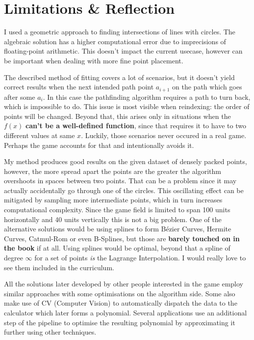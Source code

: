 \documentclass[12pt, titlepage]{article}
\begin{document}
\section{Limitations \& Reflection}
I used a geometric approach to finding intersections of lines with circles.
The algebraic solution has a higher computational error due to imprecisions 
of floating-point arithmetic. This doesn't impact the current usecase,
however can be important when dealing with more fine point placement.

The described method of fitting covers a lot of scenarios, but it doesn't yield 
correct results
when the next intended path point $a_{i + 1}$ on the path which goes after 
some $a_i$. In this case the pathfinding algorithm requires a path to turn back,
which is impossible to do. This issue is most visible when reindexing: the order
of points will be changed. Beyond that, this arises only in situations when the 
$f(x)$ \textbf{can't be a well-defined function}, since that requires it to have to
two different values at same $x$. Luckily, those scenarios never occured in a 
real game. Perhaps the game accounts for that and intentionally avoids it.

My method produces good results on the given dataset of densely packed points,
however, the more spread apart the points are the greater the algorithm
overshoots in spaces between two points. That can be a problem since it may 
actually accidentally go through one of the circles. This oscillating effect can be
mitigated by sampling more intermediate points, which in turn increases 
computational complexity. Since the game field is  limited to span 100 units
horizontally and 40 units vertically this is not a big problem. One of the
alternative solutions would be using splines to form B\'{e}zier Curves, 
Hermite Curves, Catmul-Rom or even B-Splines, but those are \textbf{barely touched 
on in the book} if at all. Using splines would be optimal, beyond that
a spline of degree $\infty$ for a set of points \textit{is} the Lagrange
Interpolation. I would really love to see them included in the 
curriculum.

All the solutions later developed by other people interested in the game employ
similar approaches with some optimisations on the algorithm side. Some also
make use of CV (Computer Vision) to automatically dispatch the data to the
calculator which later forms a polynomial. Several applications use
an additional step of the pipeline to optimise the resulting polynomial
by approximating it further using other techniques.
\end{document}
